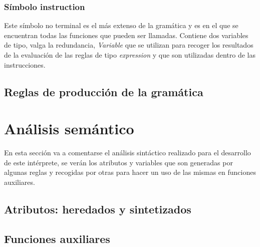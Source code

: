 \documentclass[a4paper,12pt,twoside,openright]{report}
\begin{document}
      \subsubsection{Símbolo instruction}
      Este símbolo no terminal es el más extenso de la gramática y es en el que se encuentran todas las funciones que 
      pueden ser llamadas. Contiene dos variables de tipo, valga la redundancia, \emph{Variable} que se utilizan para 
      recoger los resultados de la evaluación de las reglas de tipo \emph{expression} y que son utilizadas dentro de 
      las instrucciones.

    \subsection{Reglas de producción de la gramática}
   
  \section{Análisis semántico}
  En esta sección va a comentarse el análisis sintáctico realizado para el desarrollo de este intérprete, se verán los 
  atributos y variables que son generadas por algunas reglas y recogidas por otras para hacer un uso de las mismas en 
  funciones auxiliares.
    \subsection{Atributos: heredados y sintetizados}
    
    \subsection{Funciones auxiliares}
\end{document}

